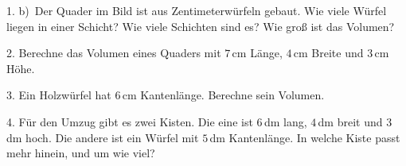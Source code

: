 \documentclass[11pt]{article}
\begin{document}
\begin{pfaufg}{}{1.}{}
{b)\ Der Quader im Bild ist aus Zentimeterwürfeln gebaut. Wie viele Würfel liegen in einer Schicht? Wie viele Schichten sind es? Wie groß ist das Volumen?}
\end{pfaufg}

\begin{pfaufg}{}{2.}{}
Berechne das Volumen eines Quaders mit $7$\,cm Länge, $4$\,cm Breite und $3$\,cm Höhe.
\end{pfaufg}

\begin{pfaufg}{}{3.}{}
Ein Holzwürfel hat $6$\,cm Kantenlänge. Berechne sein Volumen.
\end{pfaufg}

\begin{pfaufg}{}{4.}{}
Für den Umzug gibt es zwei Kisten. Die eine ist $6$\,dm lang, $4$\,dm breit und $3$\,dm hoch. Die andere ist ein Würfel mit $5$\,dm Kantenlänge. In welche Kiste passt mehr hinein, und um wie viel?
\end{pfaufg}
\end{document}
